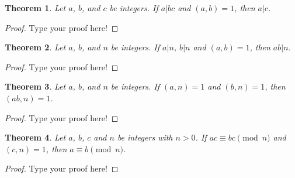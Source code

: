 \documentclass[12pt,leqno]{article}
\numberwithin{equation}{section}
\newtheorem{thm}{Theorem}[section]
\theoremstyle{definition}
\begin{document}
\begin{thm}
Let $a$, $b$, and $c$ be integers.  If $a|bc$ and $(a, b) = 1$, then
$a|c$.
\end{thm}

\begin{proof}[Proof]
Type your proof here!
\end{proof}

\begin{thm}
Let $a$, $b$, and $n$ be integers.  If $a|n$, $b|n$ and $(a, b) =
1$, then $ab|n$.
\end{thm}

\begin{proof}[Proof]
Type your proof here!
\end{proof}

\begin{thm}
Let $a$, $b$, and $n$ be integers. If $(a, n) = 1$ and $(b, n) = 1$,
then~\mbox{$(ab, n) = 1$}.
\end{thm}

\begin{proof}[Proof]
Type your proof here!
\end{proof}

\setcounter{thm}{44}

\begin{thm}
Let $a$, $b$, $c$ and $n$ be integers with $n > 0$.  If $ac \equiv
bc \pmod{n}$ and $(c,n) = 1$, then $a \equiv b \pmod{n}$.
\end{thm}


\begin{proof}[Proof]
Type your proof here!
\end{proof}
\end{document}
